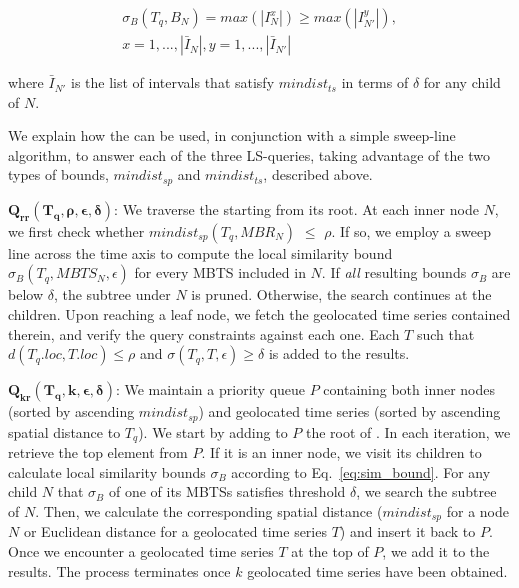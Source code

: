 {\begin{equation}
\begin{split}
\sigma_{B}(T_q, B_N) = max(|I_N^x|) \geq max(|I_{N'}^y|), \\
 x = 1, ..., |\bar{I}_N|,  y = 1, ..., |\bar{I}_{N'}|
\end{split}
\label{eq:maxdur_ts}
\end{equation}


\noindent where $\bar{I}_{N'}$ is the list of intervals that satisfy $mindist_{ts}$ in terms of $\delta$ for any child of $N$.

}



We explain how the \btsr can be used, in conjunction with a simple sweep-line algorithm, to answer each of the three LS-queries, taking advantage of the two types of bounds, $mindist_{sp}$ and $mindist_{ts}$, described above.



\vspace{2mm}

\noindent $\mathbold{Q_{rr}(T_q, \rho, \epsilon, \delta)}$: We traverse the \btsr starting from its root. At each inner node $N$, we first check whether $mindist_{sp}(T_q, MBR_N)$ $\leq$ $\rho$. If so, we employ a sweep line across the time axis to compute the local similarity bound $\sigma_{B}(T_q, MBTS_N, \epsilon)$ for every MBTS included in $N$. If {\em all} resulting bounds $\sigma_{B}$ are below $\delta$, the subtree under $N$ is pruned. Otherwise, the search continues at the children. Upon reaching a leaf node, we fetch the geolocated time series contained therein, and verify the query constraints against each one. Each $T$ such that $d(T_q.loc, T.loc) \leq \rho$ and $\sigma(T_q, T, \epsilon) \geq \delta$ is added to the results.

\vspace{2mm}

\noindent $\mathbold{Q_{kr}(T_q, k, \epsilon, \delta)}$: We maintain a priority queue $P$ containing both inner nodes (sorted by ascending $mindist_{sp}$) and geolocated time series (sorted by ascending spatial distance to $T_q$). We start by adding to $P$ the root of \btsr. In each iteration, we retrieve the top element from $P$. If it is an inner node, we visit its children to calculate local similarity bounds $\sigma_B$ according to Eq.~\ref{eq:sim_bound}. For any child $N$ that $\sigma_B$ of one of its MBTSs satisfies threshold $\delta$, we search the subtree of $N$. Then, we calculate the corresponding spatial distance ($mindist_{sp}$ for a node $N$ or Euclidean distance for a geolocated time series $T$) and insert it back to $P$. Once we encounter a geolocated time series $T$ at the top of $P$, we add it to the results. The process terminates once $k$ geolocated time series have been obtained.

